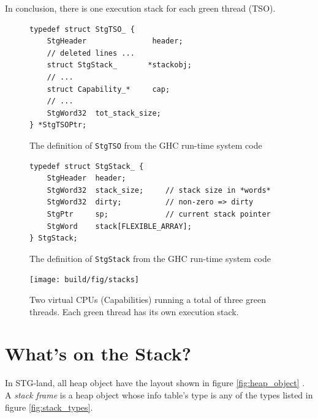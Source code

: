 In conclusion, there is one execution stack for each green thread (TSO).

\begin{figure}
\begin{mdframed}
  \begin{verbatim}
typedef struct StgTSO_ {
    StgHeader               header;
    // deleted lines ...
    struct StgStack_       *stackobj;
    // ...
    struct Capability_*     cap;
    // ...
    StgWord32  tot_stack_size;
} *StgTSOPtr;
  \end{verbatim}
  \caption{The definition of \texttt{StgTSO} from the GHC run-time system
code}
  \label{fig:tso_definition}
\end{mdframed}
\end{figure}

\begin{figure}
\begin{mdframed}
  \begin{verbatim}
typedef struct StgStack_ {
    StgHeader  header;
    StgWord32  stack_size;     // stack size in *words*
    StgWord32  dirty;          // non-zero => dirty
    StgPtr     sp;             // current stack pointer
    StgWord    stack[FLEXIBLE_ARRAY];
} StgStack;
  \end{verbatim}
  \caption{The definition of \texttt{StgStack} from the GHC run-time system
code}
  \label{fig:stack_definition}
\end{mdframed}
\end{figure}

\begin{figure}
\begin{mdframed}
  \centering
  \texttt{[image: build/fig/stacks]}
  \caption{Two virtual CPUs (Capabilities) running a total of three
green threads. Each green thread has its own execution stack.}
  \label{fig:stacks}
\end{mdframed}
\end{figure}

\section{What's on the Stack?} \label{sec:whats_on_the_stack}

In STG-land, all heap object have the layout shown in figure
\ref{fig:heap_object} \cite{commentary_heap_objects}.
A \emph{stack frame} is a heap object whose
info table's type is any of the types listed in figure \ref{fig:stack_types}.

